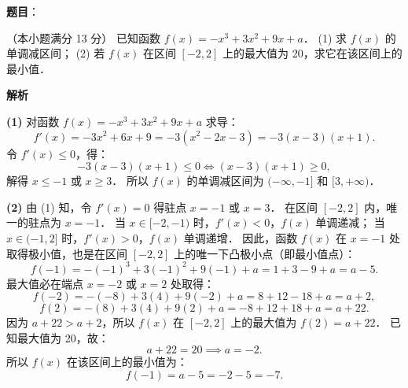 \begin{answer}

\textbf{题目}：

（本小题满分 13 分）
已知函数 $f(x) = -x^3 + 3x^2 + 9x + a$．
(1) 求 $f(x)$ 的单调减区间；
(2) 若 $f(x)$ 在区间 $[-2, 2]$ 上的最大值为 20，求它在该区间上的最小值．

\textbf{解析}

\textbf{(1)}
对函数 $f(x) = -x^3 + 3x^2 + 9x + a$ 求导：
\nopagebreak[4]
\[
f'(x) = -3x^2 + 6x + 9 = -3(x^2 - 2x - 3) = -3(x - 3)(x + 1).
\]
令 $f'(x) \leqslant 0$，得：
\nopagebreak[4]
\[
-3(x - 3)(x + 1) \leqslant 0 \iff (x - 3)(x + 1) \geqslant 0,
\]
解得 $x \leqslant -1$ 或 $x \geqslant 3$．
所以 $f(x)$ 的单调减区间为 $(-\infty, -1]$ 和 $[3, +\infty)$．

\textbf{(2)}
由 (1) 知，令 $f'(x) = 0$ 得驻点 $x = -1$ 或 $x = 3$．
在区间 $[-2, 2]$ 内，唯一的驻点为 $x = -1$．
当 $x \in [-2, -1)$ 时，$f'(x) < 0$，$f(x)$ 单调递减；
当 $x \in (-1, 2]$ 时，$f'(x) > 0$，$f(x)$ 单调递增．
因此，函数 $f(x)$ 在 $x = -1$ 处取得极小值，也是在区间 $[-2, 2]$ 上的唯一下凸极小点（即最小值点）：
\nopagebreak[4]
\[
f(-1) = -(-1)^3 + 3(-1)^2 + 9(-1) + a = 1 + 3 - 9 + a = a - 5.
\]
最大值必在端点 $x = -2$ 或 $x = 2$ 处取得：
\nopagebreak[4]
\[
f(-2) = -(-8) + 3(4) + 9(-2) + a = 8 + 12 - 18 + a = a + 2,
\]
\nopagebreak[4]
\[
f(2) = -(8) + 3(4) + 9(2) + a = -8 + 12 + 18 + a = a + 22.
\]
因为 $a + 22 > a + 2$，所以 $f(x)$ 在 $[-2, 2]$ 上的最大值为 $f(2) = a + 22$．
已知最大值为 20，故：
\nopagebreak[4]
\[
a + 22 = 20 \implies a = -2.
\]
所以 $f(x)$ 在该区间上的最小值为：
\nopagebreak[4]
\[
f(-1) = a - 5 = -2 - 5 = -7.
\]

\gkanswer{答案（1）：单调减区间为 $(-\infty, -1]$ 和 $[3, +\infty)$。}


\end{answer}
